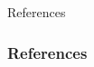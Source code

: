 \documentclass{beamer}
\begin{document}
		\begin{frame}[standout]
		References
		  
		\end{frame}

	
		\begin{frame}[allowframebreaks]\frametitle{References}
			
		    
		\end{frame}

\end{document}

